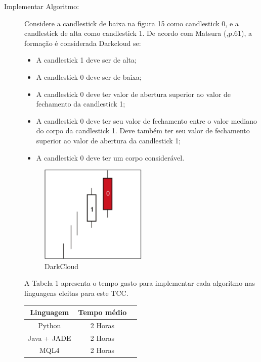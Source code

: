 \begin{description}
\item [Implementar Algoritmo:]
Considere a candlestick de baixa na figura 15 como candlestick 0, e a candlestick de alta como candlestick 1. De acordo com Matsura (\citeyear{matsura2006},p.61), a formação é considerada Darkcloud se:

\begin{itemize}
  \item A candlestick 1 deve ser de alta;
  \item A candlestick 0 deve ser de baixa;
  \item A candlestick 0 deve ter valor de abertura superior ao valor de fechamento da candlestick 1;
  \item A candlestick 0 deve ter seu valor de fechamento entre o valor mediano do corpo da candlestick 1. Deve também ter seu valor de fechamento superior ao valor de abertura da candlestick 1;
  \item A candlestick 0 deve ter um corpo considerável.
\end{itemize}

\begin{figure}[h!]
\centering
\label{f15}
\includegraphics[width=0.5\textwidth]{figuras/f12}
\caption{DarkCloud}
\end{figure}

A Tabela 1  apresenta o tempo gasto para implementar cada algoritmo nas linguagens eleitas para este TCC.

\begin{table}[h]
	\centering
	\label{t01}
	
	\begin{tabular}{ccc}
		\toprule
		\textbf{Linguagem} & \textbf{Tempo médio}\\
		\midrule
		Python & 2 Horas  \\
		Java + JADE & 2 Horas  \\
		MQL4 & 2 Horas  \\
		\bottomrule
	\end{tabular}


\end{table}
\end{description}
